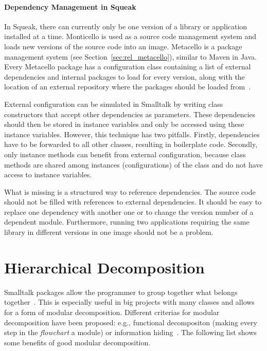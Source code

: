 \paragraph{Dependency Management in Squeak}
In Squeak, there can currently only be one version of a library or application installed at a time. Monticello is used as a source code management system and loads new versions of the source code into an image. Metacello is a package management system (see Section~\ref{sec:rel_metacello}), similar to Maven in Java. Every Metacello package has a configuration class containing a list of external dependencies and internal packages to load for every version, along with the location of an external repository where the packages should be loaded from~\cite{metacellodraft}.

External configuration can be simulated in Smalltalk by writing class constructors that accept other dependencies as parameters. These dependencies should then be stored in instance variables and only be accessed using these instance variables. However, this technique has two pitfalls. Firstly, dependencies have to be forwarded to all other classes, resulting in boilerplate code. Secondly, only instance methods can benefit from external configuration, because class methods are shared among instances (configurations) of the class and do not have access to instance variables.

What is missing is a structured way to reference dependencies. The source code should not be filled with references to external dependencies. It should be easy to replace one dependency with another one or to change the version number of a dependent module. Furthermore, running two applications requiring the same library in different versions in one image should not be a problem.

\section{Hierarchical Decomposition}
\label{sec:problem_hier_decomp}
Smalltalk packages allow the programmer to group together what belongs together~\cite{Eckel:2002:TJ:579108}. This is especially useful in big projects with many classes and allows for a form of modular decomposition. Different criterias for modular decomposition have been proposed: e.g., functional decompositon (making every step in the \emph{flowchart} a module) or information hiding~\cite{Parnas:1972:CUD:361598.361623, Parnas:1984:MSC:800054.801999}. The following list shows some benefits of good modular decomposition.

